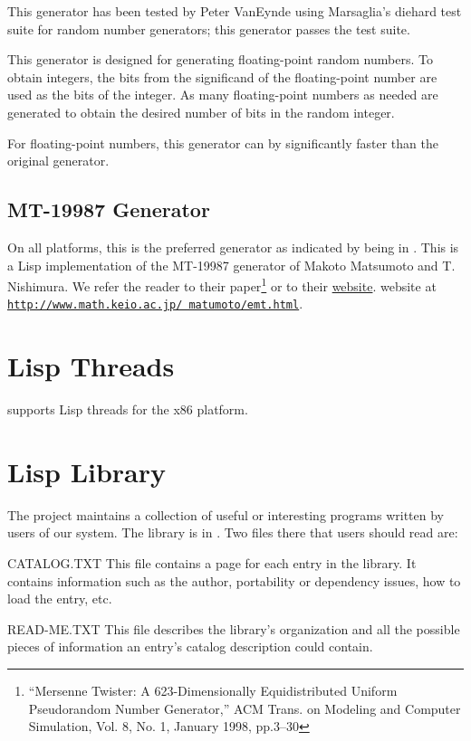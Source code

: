 This generator has been tested by Peter VanEynde using Marsaglia's
diehard test suite for random number generators;  this generator
passes the test suite.

This generator is designed for generating floating-point random
numbers.  To obtain integers, the bits from the significand of the
floating-point number are used as the bits of the integer.  As many
floating-point numbers as needed are generated to obtain the desired
number of bits in the random integer.

For floating-point numbers, this generator can by significantly faster 
than the original generator.

\subsection{MT-19987 Generator}
On all platforms, this is the preferred generator as indicated by
 being in .  This is a Lisp
implementation of the MT-19987 generator of Makoto Matsumoto and
T. Nishimura.  We refer the reader to their paper\footnote{``Mersenne
  Twister: A 623-Dimensionally Equidistributed Uniform Pseudorandom
  Number Generator,'' ACM Trans. on Modeling and Computer Simulation,
  Vol. 8, No. 1, January 1998, pp.3--30} or to
their
\ifpdf
\href{http://www.math.keio.ac.jp/~matumoto/emt.html}{website}.
\else
website at
\href{http://www.math.keio.ac.jp/~matumoto/emt.html}{\texttt{http://www.math.keio.ac.jp/~matumoto/emt.html}}.
\fi

\section{Lisp Threads}

\cmucl{} supports Lisp threads for the x86 platform.

\section{Lisp Library}
\label{lisp-lib}

The \cmucl{} project maintains a collection of useful or interesting
programs written by users of our system.  The library is in
.  Two files there that users should read are:
\begin{Lentry}

\item[CATALOG.TXT]
This file contains a page for each entry in the library.  It
contains information such as the author, portability or dependency issues, how
to load the entry, etc.

\item[READ-ME.TXT]
This file describes the library's organization and all the
possible pieces of information an entry's catalog description could contain.
\end{Lentry}

